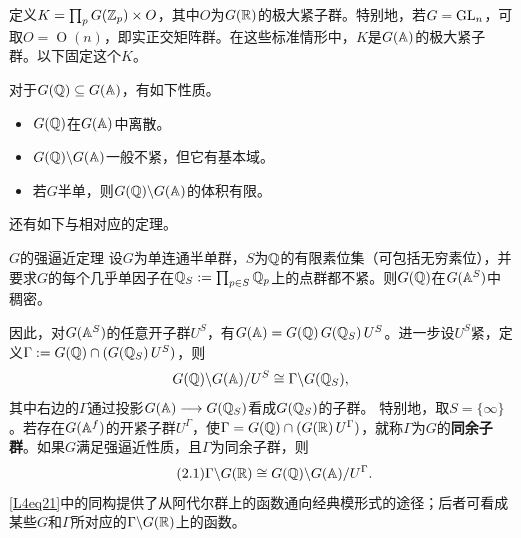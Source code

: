 定义$K=\prod_p G(\mathbb{Z}_p)\times O$，其中$O$为$G(\mathbb{R})$的极大紧子群。特别地，若$G=\operatorname{GL}_n$，可取$O=\operatorname O(n)$，即实正交矩阵群。在这些标准情形中，$K$是$G(\mathbb{A})$的极大紧子群。以下固定这个$K$。

对于$G(\mathbb{Q})\subseteq G(\mathbb{A})$，有如下性质。
\begin{property}
\begin{itemize}
\item $G(\mathbb{Q})$在$G(\mathbb{A})$中离散。
\item $G(\mathbb{Q})\backslash G(\mathbb{A})$一般不紧，但它有基本域。
\item 若$G$半单，则$G(\mathbb{Q})\backslash G(\mathbb{A})$的体积有限。
\end{itemize}
\end{property}
还有如下与相对应的定理。
\begin{theorem}{$G$的强逼近定理}\label{L4S2O1}
设$G$为单连通半单群，$S$为$\mathbb{Q}$的有限素位集（可包括无穷素位），并要求$G$的每个几乎单因子在$\mathbb{Q}_S:=\prod_{p\in S}\mathbb{Q}_p$上的点群都不紧。则$G(\mathbb{Q})$在$G(\mathbb{A}^S)$中稠密。
\end{theorem}
因此，对$G(\mathbb{A}^S)$的任意开子群$U^S$，有$G(\mathbb{A})=G(\mathbb{Q})\,G(\mathbb{Q}_S)\,U^S$。进一步设$U^S$紧，定义$\Gamma:=G(\mathbb{Q})\cap(G(\mathbb{Q}_S)\,U^S)$，则
\[G(\mathbb{Q})\backslash G(\mathbb{A})/U^S\cong\Gamma\backslash G(\mathbb{Q}_S),\]
其中右边的$\Gamma$通过投影$G(\mathbb{A})\longrightarrow G(\mathbb{Q}_S)$看成$G(\mathbb{Q}_S)$的子群。
特别地，取$S=\{\infty\}$。若存在$G(\mathbb{A}^f)$的开紧子群$U^\Gamma$，使$\Gamma=G(\mathbb{Q})\cap(G(\mathbb{R})\,U^\Gamma)$，就称$\Gamma$为$G$的\textbf{同余子群}。如果$G$满足强逼近性质，且$\Gamma$为同余子群，则
\begin{equation}\tag{2.1}\label{L4eq21}
\Gamma\backslash G(\mathbb{R})\cong G(\mathbb{Q})\backslash G(\mathbb{A})/U^\Gamma.
\end{equation}
\eqref{L4eq21}中的同构提供了从阿代尔群上的函数通向经典模形式的途径；后者可看成某些$G$和$\Gamma$所对应的$\Gamma\backslash G(\mathbb{R})$上的函数。

